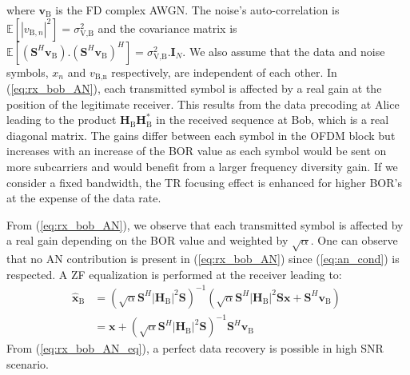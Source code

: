 \documentclass[journal,comsoc]{IEEEtran}
\newcommand{\module}[1]{\left|#1\right|}
\newcommand{\EX}[1]{\mathbb{E} \left[#1\right]}%
\newcommand{\HB}{\textbf{H}_{\text{B}}}
\newcommand{\spread}{\textbf{S}}
\begin{document}
where $\textbf{v}_\text{B}$ is the FD complex AWGN. The noise's auto-correlation is $\EX{|v_{\text{B},n}|^2}  = \sigma_{\text{V,B}}^2$ and the covariance matrix is $\EX{(\spread^H  \textbf{v}_\text{B}) . (\spread^H \textbf{v}_\text{B})^H} = \sigma_{\text{V,B}}^2 . \textbf{I}_N$. We also assume that the data and noise symbols,  $x_n$ and $v_{\text{B,n}}$ respectively, are independent of each other. In (\ref{eq:rx_bob_AN}), each transmitted symbol is affected by a real gain at the position of the legitimate receiver. This results from the data precoding at Alice leading to the product $\HB\HB^*$ in the received sequence at Bob, which is a real diagonal matrix. The gains differ between each symbol in the OFDM block but increases with an increase of the BOR value as each symbol would be sent on more subcarriers and would benefit from a larger frequency diversity gain. If we consider a fixed bandwidth, the TR focusing effect is enhanced for higher BOR's at the expense of the data rate.


From (\ref{eq:rx_bob_AN}), we observe that each transmitted symbol is affected by a real gain depending on the BOR value and weighted by $\sqrt{\alpha}$. One can observe that no AN contribution is present in (\ref{eq:rx_bob_AN}) since (\ref{eq:an_cond}) is respected. A ZF equalization is performed at the receiver leading to:
\begin{equation}
\begin{split}
\hat{\textbf{x}}_{\text{B}} &= \left( \sqrt{\alpha} \spread^H \module{\HB}^2 \spread \right)^{-1}  \left(\sqrt{\alpha}  \spread^H\module{\HB}^2 \spread \textbf{x}   +    \spread^H \textbf{v}_\text{B}\right) \\
&= \textbf{x} + \left( \sqrt{\alpha} \spread^H \module{\HB}^2 \spread \right)^{-1} \spread^H \textbf{v}_\text{B}
\end{split}
\
\label{eq:rx_bob_AN_eq}
\end{equation}
From (\ref{eq:rx_bob_AN_eq}), a perfect data recovery is possible in high SNR scenario.



%
\end{document}
